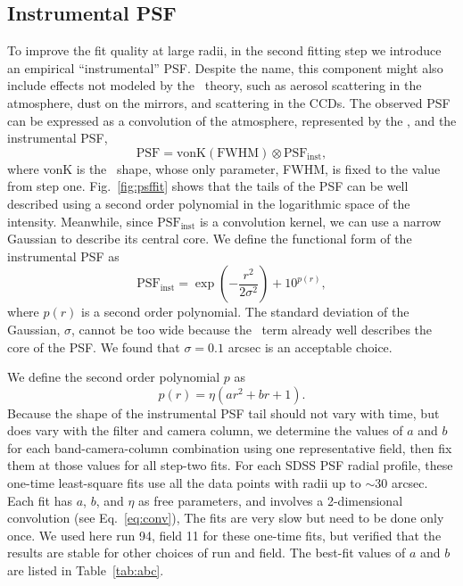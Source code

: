 \subsection{Instrumental PSF \label{sec:instrPSF}} 

To improve the fit quality at large radii, in the second fitting step we introduce an
empirical ``instrumental'' PSF. Despite the name, this component might also include 
effects not modeled by the \vk~theory, such as aerosol scattering in the atmosphere,
dust on the mirrors, and scattering in the CCDs. The observed PSF can be expressed 
as a convolution of the atmosphere, represented 
by the \vk, and the instrumental PSF,
\begin{equation}
        \textrm{PSF} = \textrm{vonK} (\textrm{FWHM}) \otimes
        \textrm{PSF}_{\textrm{inst}},
\label{eq:conv}
\end{equation} 
where vonK is the \vk~shape, whose only parameter, FWHM, is fixed to
the value from step one.
Fig.~\ref{fig:psffit} shows that the tails of the PSF can be well
described using a second order polynomial in the logarithmic space of
the intensity.
Meanwhile, since $\textrm{PSF}_{\textrm{inst}}$ is a convolution
kernel, we can use a narrow Gaussian to describe its central core.
We define the functional form of the instrumental PSF as
\begin{equation}
        \textrm{PSF}_{\textrm{inst}} = \exp(-\frac{r^2}{2\sigma^2}) + 10^{p(r)},
\label{eq:psfinst}
\end{equation} 
where $p(r)$ is a second order polynomial.
The standard deviation of the Gaussian, $\sigma$, cannot be
too wide because the \vk~term already well describes the core of the
PSF.
We found that $\sigma = 0.1$ arcsec is an acceptable choice.

We define the second order polynomial $p$ as
\begin{equation}
        p(r) = \eta(ar^2+br+1).
\label{eq:psfinstp}
\end{equation} 
Because the shape of the instrumental PSF tail should not vary with
time, but does vary with the filter and camera column,
we determine the values of $a$ and $b$ for each band-camera-column
combination using one representative
field, then fix them at those values for all step-two fits.
For each SDSS PSF radial profile,
these one-time least-square fits use all the data points with radii up
to $\sim$30 arcsec.
Each fit has $a$, $b$, and $\eta$ as free parameters, and involves a 2-dimensional convolution (see Eq.~\ref{eq:conv}),
The fits are very slow but need to be done only once.
We used here run 94, field 11 for these one-time fits, but verified that 
the results are stable for other choices of run and field. 
The best-fit values of $a$ and $b$ are listed in Table~\ref{tab:abc}.

